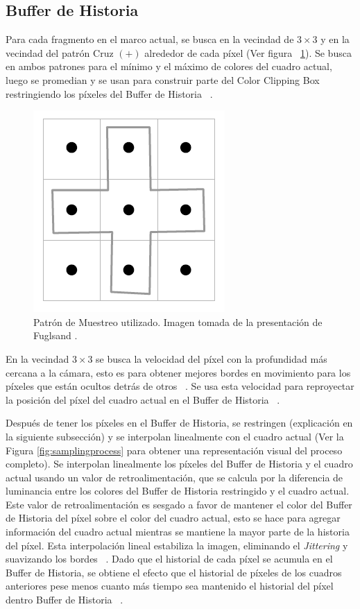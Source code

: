 \documentclass[pregrado]{tesis-usb} %
\begin{document}
\subsection{Buffer de Historia}
Para cada fragmento en el marco actual, se busca en la vecindad de $3\times 3$ y en la vecindad del patrón Cruz $(+)$ alrededor de cada píxel (Ver figura ~\ref{fig:samplingpattern}). Se busca en ambos patrones para el mínimo y el máximo de colores del cuadro actual, luego se promedian y se usan para construir parte del Color Clipping Box restringiendo los píxeles del Buffer de Historia ~\cite{Fuglsand2016}. 
\begin{figure}[!hbt]
	\centering
	\includegraphics[scale=0.8]{images/sampling_pattern.png}
	\caption{Patrón de Muestreo utilizado. Imagen tomada de la presentación de Fuglsand \protect\cite{Fuglsand2016}.}\label{fig:samplingpattern}
\end{figure}

En la vecindad $3\times 3$ se busca la velocidad del píxel con la profundidad más cercana a la cámara, esto es para obtener mejores bordes en movimiento para los píxeles que están ocultos detrás de otros ~\cite{Fuglsand2016}. Se usa esta velocidad para reproyectar la posición del píxel del cuadro actual en el Buffer de Historia ~\cite{Fuglsand2016, XU2016}. 

Después de tener los píxeles en el Buffer de Historia, se restringen (explicación en la siguiente subsección) y se interpolan linealmente con el cuadro actual (Ver la Figura \ref{fig:samplingprocess} para obtener una representación visual del proceso completo). Se interpolan linealmente los píxeles del Buffer de Historia y el cuadro actual usando un valor de retroalimentación, que se calcula por la diferencia de luminancia entre los colores del Buffer de Historia restringido y el cuadro actual. Este valor de retroalimentación es sesgado a favor de mantener el color del Buffer de Historia del píxel sobre el color del cuadro actual, esto se hace para agregar información del cuadro actual mientras se mantiene la mayor parte de la historia del píxel. Esta interpolación lineal estabiliza la imagen, eliminando el \textit{Jittering} y suavizando los bordes ~\cite{Fuglsand2016, XU2016}. Dado que el historial de cada píxel se acumula en el Buffer de Historia, se obtiene el efecto que el historial de píxeles de los cuadros anteriores pese menos cuanto más tiempo sea mantenido el historial del píxel dentro Buffer de Historia ~\cite{Fuglsand2016}. 
\end{document}
